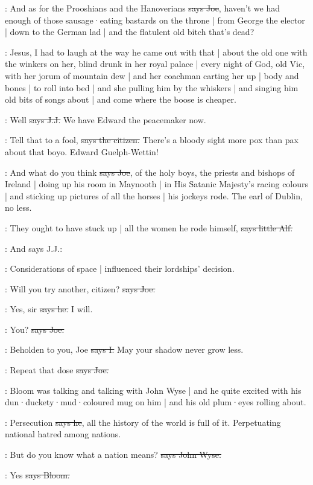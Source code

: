 \joe:
And as for the Prooshians and the Hanoverians
\sout{says Joe},
haven't we had enough of those sausage·eating bastards on the throne |
from George the elector |
down to the German lad |
and the flatulent old bitch that's dead?

\Nq:
Jesus,
I had to laugh at the way he came out with that |
about the old one with the winkers on her,
blind drunk in her royal palace |
every night of God,
old Vic,
with her jorum of mountain dew |
and her coachman carting her up |
body and bones |
to roll into bed |
and she pulling him by the whiskers |
and singing him old bits of songs about  |
and come where the boose is cheaper.

\jjom:
Well
\sout{says J.J.}
We have Edward the peacemaker now.

\citizen:
Tell that to a fool,
\sout{says the citizen.}
There's a bloody sight more pox than pax about that boyo.
Edward Guelph-Wettin!

\joe:
And what do you think
\sout{says Joe},
of the holy boys,
the priests and bishops of Ireland |
doing up his room in Maynooth |
in His Satanic Majesty's racing colours |
and sticking up pictures of all the horses |
his jockeys rode.
The earl of Dublin,
no less.

\bergan:
They ought to have stuck up |
all the women he rode himself,
\sout{says little Alf.}

\Nq:
And says J.J.:

\jjom:
Considerations of space |
influenced their lordships' decision.

\joe:
Will you try another,
citizen?
\sout{says Joe.}

\citizen:
Yes,
sir
\sout{says he.}
I will.

\joe:
You?
\sout{says Joe.}

:
Beholden to you,
Joe
\sout{says I.}
May your shadow never grow less.

\joe:
Repeat that dose
\sout{says Joe.}

\Nq:
Bloom was talking and talking with John Wyse |
and he quite excited with his dun·duckety·mud·coloured mug on him |
and his old plum·eyes rolling about.

\Bloom:
Persecution
\sout{says he},
all the history of the world is full of it.
Perpetuating national hatred among nations.

\johnwyse:
But do you know what a nation means?
\sout{says John Wyse.}

\Bloom:
Yes
\sout{says Bloom.}

